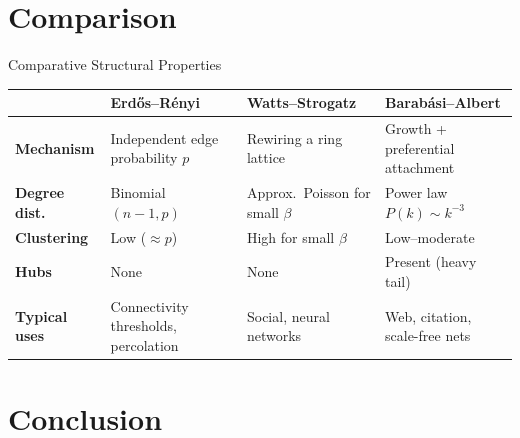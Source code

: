 \documentclass[t]{beamer}
\begin{document}
\section{Comparison}

\begin{frame}{Comparative Structural Properties}

\setlength{\tabcolsep}{4pt}
\renewcommand{\arraystretch}{1.15}
\begin{table}[h]
\scriptsize
\begin{tabular}{>{\bfseries}p{2.2cm} p{2.5cm} p{2.5cm} p{2.5cm}}
\toprule
 & \textbf{Erd\H{o}s--R\'{e}nyi} & \textbf{Watts--Strogatz} & \textbf{Barab\'{a}si--Albert} \\
\midrule
Mechanism      & Independent edge probability $p$ & Rewiring a ring lattice & Growth + preferential attachment \\
\addlinespace
Degree dist.   & Binomial$(n{-}1,p)$ & Approx.\ Poisson for small $\beta$ & Power law $P(k)\sim k^{-3}$ \\
\addlinespace
Clustering     & Low ($\approx p$) & High for small $\beta$ & Low–moderate \\
\addlinespace
Hubs           & None & None & Present (heavy tail) \\
\addlinespace
Typical uses   & Connectivity thresholds, percolation & Social, neural networks & Web, citation, scale-free nets \\
\bottomrule
\end{tabular}
\end{table}

\end{frame}

\section{Conclusion}
\end{document}
